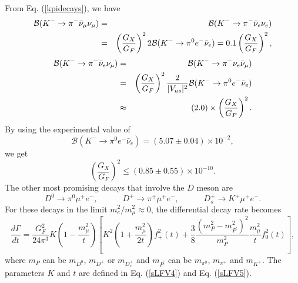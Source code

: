 \documentclass{ws-ijmpa}
\begin{document}
From Eq. (\ref{kpidecays}), we have
\begin{eqnarray}
\mathcal{B}(K^{-} \to \pi^{-}\bar{\nu}_{\mu}\nu_{\mu}) & = & \mathcal{B}(K^{-} \to \pi^{-}\bar{\nu}_{e}\nu_{e}) \notag\\
& = &\left(\frac{G_X}{G_F}\right)^2 2\mathcal{B}(K^{-} \to \pi^{0}e^{-}\bar{\nu}_{e}) = 0.1 \left(\frac{G_X}{G_F}\right)^2\label{kpiLFC-decays},
\end{eqnarray}
\begin{eqnarray}
\mathcal{B}(K^{-} \to \pi^{-}\bar{\nu}_{e}\nu_{\mu}) &=& \mathcal{B}(K^{-} \to \pi^{-}\nu_{e}\bar{\nu}_{\mu})\notag\\
& = &\left(\frac{G_X}{G_F}\right)^2\frac{2}{|V_{us}|^2}\mathcal{B}(K^{-} \to \pi^{0}e^{-}\bar{\nu}_{e})\notag \\
& \approx & (2.0)\times \left(\frac{G_X}{G_F}\right)^2\label{KmBr}.
\end{eqnarray}
By using the experimental value of 
\begin{equation}
\mathcal{B}(K^{-} \to \pi^{0}e^{-}\bar{\nu}_{e}) = (5.07\pm 0.04)\times 10^{-2} \label{ktopi0},
\end{equation}
we get
\begin{equation}
\left(\frac{G_X}{G_F}\right)^2 \leq (0.85 \pm 0.55)\times 10^{-10} \label{GXG-ratio}.
\end{equation}
The other most promising decays that involve the $D$ meson are
\begin{equation}
D^{0} \to \pi^{0} \mu^{+} e^{-}, \quad\quad\quad D^{+} \to \pi^{+} \mu^{+} e^{-}, \quad\quad\quad D_{s}^{+} \to K^{+} \mu^{+} e^{-}.
\end{equation}
For these decays in the limit $m^{2}_{e}/m^2_{\mu} \approx 0$, the differential decay rate becomes
\begin{equation}
\frac{d\Gamma}{dt} = \frac{G_{F}^2}{24\pi^3}K(1-\frac{m_{\mu}^{2}}{t})\left[K^2\left(1+\frac{m^2_{\mu}}{2t}\right)f^2_{+}(t)+\frac{3}{8}\frac{(m^2_{P}-m^2_{P^{\prime}})^2}{m^2_{P}}\frac{m^2_{\mu}}{t}f^2_{0}(t)\right]\label{sLFVD},
\end{equation}
where $m_{P}$ can be $m_{D^0}$, $m_{D^{+}}$ or $m_{D_{s}^{+}}$ and $m_{P^{\prime}}$ can be $m_{\pi^{0}}$, $m_{\pi^{+}}$ and $m_{K^{+}}$. The parameters $K$ and $t$ are defined in Eq. (\ref{sLFV4}) and Eq. (\ref{sLFV5}).
\end{document}
